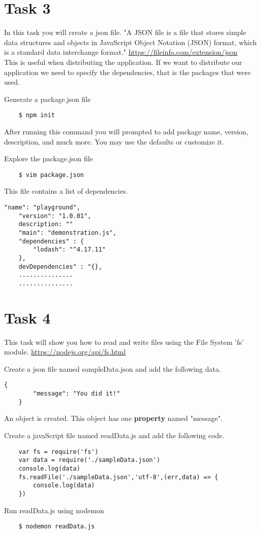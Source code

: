 \documentclass[12pt]{article}
\begin{document}
\section*{Task 3}
In this task you will create a json file. "A JSON file is a file that stores simple data structures and objects in JavaScript Object Notation (JSON) format, which is a standard data interchange format." \href{https://fileinfo.com/extension/json}{https://fileinfo.com/extension/json} \\
This is useful when distributing the application. If we want to distribute our application we need to specify the dependencies, that is the packages that were used. 
\begin{todolist}
    \item Generate a package.json file 
    \begin{lstlisting}
    $ npm init 
    \end{lstlisting}
    After running this command you will prompted to add package name, version, description, and much more. You may use the defaults or customize it. 
    \item Explore the package.json file 
    \begin{lstlisting}
    $ vim package.json 
    \end{lstlisting}
    This file contains a list of dependencies. 
    \begin{lstlisting}[title={package.json}]
    "name": "playground",
    "version": "1.0.01",
    description: ""
    "main": "demonstration.js",
    "dependencies" : {
        "lodash": "^4.17.11"
    },
    devDependencies" : "{},
    ...............
    ...............
    \end{lstlisting}
\end{todolist}
\section*{Task 4}
This task will show you how to read and write files using the File System 'fs' module. \href{https://nodejs.org/api/fs.html}{https://nodejs.org/api/fs.html}
\begin{todolist}
    \item Create a json file named sampleData.json and add the following data. 
    \begin{lstlisting}[title={sampleData.json}]
    {
        "message": "You did it!"
    }
    \end{lstlisting} 
    An object is created. This object has one \textbf{property} named "message". 
    \item Create a javaScript file named readData.js and add the following code. 
    \begin{lstlisting}
    var fs = require('fs')
    var data = require('./sampleData.json')
    console.log(data)
    fs.readFile('./sampleData.json','utf-8',(err,data) => {
        console.log(data)
    })
    \end{lstlisting}
    \item Run readData.js using nodemon 
    \begin{lstlisting}
    $ nodemon readData.js
    \end{lstlisting} 
\end{todolist}
\end{document}
